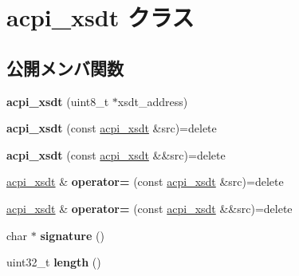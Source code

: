 \hypertarget{classacpi__xsdt}{}\section{acpi\+\_\+xsdt クラス}
\label{classacpi__xsdt}
\subsection*{公開メンバ関数}
\begin{DoxyCompactItemize}
\item 
\hypertarget{classacpi__xsdt_a45f31058ad0b744f139f16d0d667ae79}{}{\bfseries acpi\+\_\+xsdt} (uint8\+\_\+t $\ast$xsdt\+\_\+address)\label{classacpi__xsdt_a45f31058ad0b744f139f16d0d667ae79}

\item 
\hypertarget{classacpi__xsdt_a7774cba5774ac30d78c0a2c3ba181901}{}{\bfseries acpi\+\_\+xsdt} (const \hyperlink{classacpi__xsdt}{acpi\+\_\+xsdt} \&src)=delete\label{classacpi__xsdt_a7774cba5774ac30d78c0a2c3ba181901}

\item 
\hypertarget{classacpi__xsdt_a111850e71447f435e6dab860465772b4}{}{\bfseries acpi\+\_\+xsdt} (const \hyperlink{classacpi__xsdt}{acpi\+\_\+xsdt} \&\&src)=delete\label{classacpi__xsdt_a111850e71447f435e6dab860465772b4}

\item 
\hypertarget{classacpi__xsdt_a1a1897128b1afed0bd26d12465a4c98f}{}\hyperlink{classacpi__xsdt}{acpi\+\_\+xsdt} \& {\bfseries operator=} (const \hyperlink{classacpi__xsdt}{acpi\+\_\+xsdt} \&src)=delete\label{classacpi__xsdt_a1a1897128b1afed0bd26d12465a4c98f}

\item 
\hypertarget{classacpi__xsdt_a058721e1a87b15e0939a1efa9d80b9e2}{}\hyperlink{classacpi__xsdt}{acpi\+\_\+xsdt} \& {\bfseries operator=} (const \hyperlink{classacpi__xsdt}{acpi\+\_\+xsdt} \&\&src)=delete\label{classacpi__xsdt_a058721e1a87b15e0939a1efa9d80b9e2}

\item 
\hypertarget{classacpi__xsdt_a6da0f8215c9d893fc44ad8d88eacb335}{}char $\ast$ {\bfseries signature} ()\label{classacpi__xsdt_a6da0f8215c9d893fc44ad8d88eacb335}

\item 
\hypertarget{classacpi__xsdt_a3f0e588ac85030abbd73fa724402f436}{}uint32\+\_\+t {\bfseries length} ()\label{classacpi__xsdt_a3f0e588ac85030abbd73fa724402f436}


\end{DoxyCompactItemize}
